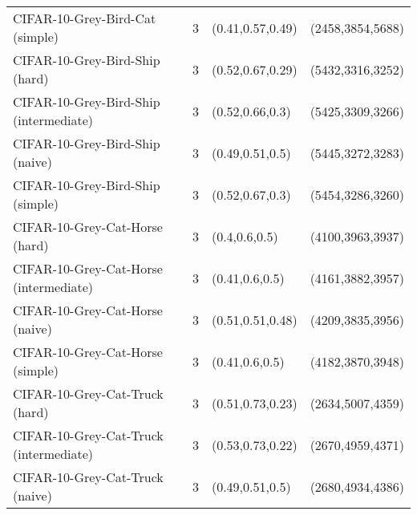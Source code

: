 \begin{tabular}{llll}
                 CIFAR-10-Grey-Bird-Cat (simple) &              3 &                                    (0.41,0.57,0.49) &                                               (2458,3854,5688) \\
                  CIFAR-10-Grey-Bird-Ship (hard) &              3 &                                    (0.52,0.67,0.29) &                                               (5432,3316,3252) \\
          CIFAR-10-Grey-Bird-Ship (intermediate) &              3 &                                     (0.52,0.66,0.3) &                                               (5425,3309,3266) \\
                 CIFAR-10-Grey-Bird-Ship (naive) &              3 &                                     (0.49,0.51,0.5) &                                               (5445,3272,3283) \\
                CIFAR-10-Grey-Bird-Ship (simple) &              3 &                                     (0.52,0.67,0.3) &                                               (5454,3286,3260) \\
                  CIFAR-10-Grey-Cat-Horse (hard) &              3 &                                       (0.4,0.6,0.5) &                                               (4100,3963,3937) \\
          CIFAR-10-Grey-Cat-Horse (intermediate) &              3 &                                      (0.41,0.6,0.5) &                                               (4161,3882,3957) \\
                 CIFAR-10-Grey-Cat-Horse (naive) &              3 &                                    (0.51,0.51,0.48) &                                               (4209,3835,3956) \\
                CIFAR-10-Grey-Cat-Horse (simple) &              3 &                                      (0.41,0.6,0.5) &                                               (4182,3870,3948) \\
                  CIFAR-10-Grey-Cat-Truck (hard) &              3 &                                    (0.51,0.73,0.23) &                                               (2634,5007,4359) \\
          CIFAR-10-Grey-Cat-Truck (intermediate) &              3 &                                    (0.53,0.73,0.22) &                                               (2670,4959,4371) \\
                 CIFAR-10-Grey-Cat-Truck (naive) &              3 &                                     (0.49,0.51,0.5) &                                               (2680,4934,4386) \\

\end{tabular}
